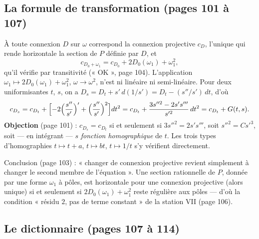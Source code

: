 \documentclass[11pt,a4paper]{article}
\begin{document}
\subsection*{La formule de transformation (pages 101 à 107)}

À toute connexion $D$ sur $\omega$ correspond la connexion projective
$c_D$, l'unique qui rende horizontale la section de $P$ définie par $D$, et
\[
  c_{D_0 + \omega_1} = c_{D_0} + 2D_0(\omega_1) + \omega_1^2 ,
\]
qu'il vérifie par transitivité (« OK », page 104). L'application
$\omega_1 \mapsto 2D_0(\omega_1) + \omega_1^2$, $\omega \to \omega^2$, n'est ni
linéaire ni semi-linéaire. Pour deux uniformisantes $t$, $s$, on a
$D_s = D_t + s'\,d(1/s') = D_t - (s''/s')\,dt$, d'où
\[
  c_{D_s} = c_{D_t} + \Bigl[-2\Bigl(\frac{s''}{s'}\Bigr)' +
  \Bigl(\frac{s''}{s'}\Bigr)^2\Bigr]dt^2
  = c_{D_t} + \frac{3s''^2 - 2s's'''}{s'^2}\,dt^2 = c_{D_t} + G(t,s).
\]
\textbf{Objection} (page 101) : $c_{D_s} = c_{D_t}$ si et seulement si
$3s''^2 = 2s's'''$, soit $s''^2 = C s'^3$, soit — en intégrant — $s$
\emph{fonction homographique} de $t$. Les trois types d'homographies
$t \mapsto t + a$, $t \mapsto bt$, $t \mapsto 1/t$ s'y vérifient
directement.

Conclusion (page 103) : « changer de connexion projective revient simplement
à changer le second membre de l'équation ». Une section rationnelle de $P$,
donnée par une forme $\omega_1$ à pôles, est horizontale pour une connexion
projective (alors unique) si et seulement si $2D_0(\omega_1) + \omega_1^2$
reste régulière aux pôles — d'où la condition « résidu $2$, pas de terme
constant » de la station VII (page 106).

\subsection*{Le dictionnaire (pages 107 à 114)}
\end{document}
